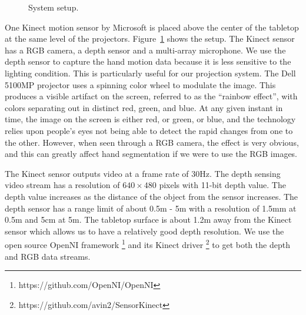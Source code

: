 \begin{figure}
  \centering
  \caption{System setup.} \label{fig:setup}
\end{figure}

One Kinect motion sensor by Microsoft is placed above the center of the tabletop
at the same level of the projectors. Figure~\ref{fig:setup} shows the setup. The
Kinect sensor has a RGB camera, a depth sensor and a multi-array microphone.
We use the depth sensor to capture the hand motion data because it is
less sensitive to the lighting condition. This is particularly useful for our
projection system. The Dell 5100MP projector uses a spinning color wheel to
modulate the image. This produces a visible artifact on the screen, referred to 
as the ``rainbow effect'', with colors separating out in distinct red, green, 
and blue. At any given instant in time, the image on the screen is either red, or green, or blue,
and the technology relies upon people's eyes not being able to detect the rapid 
changes from one to the other. However, when seen through a RGB camera, the
effect is very obvious, and this can greatly affect hand segmentation if we were to use 
the RGB images. 

The Kinect sensor outputs video at a frame rate of 30Hz. The depth sensing video
stream has a resolution of $640\times 480$ pixels with 11-bit depth value. The
depth value increases as the distance of the object from the sensor increases.
The depth sensor has a range limit of about 0.5m - 5m with a resolution of 1.5mm
at 0.5m and 5cm at 5m. The tabletop surface is about 1.2m away from the Kinect
sensor which allows us to have a relatively good depth resolution. We use the
open source OpenNI framework \footnote{https://github.com/OpenNI/OpenNI} and its
Kinect driver \footnote{https://github.com/avin2/SensorKinect} to get both the depth and RGB data streams.

